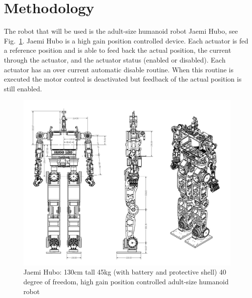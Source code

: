 \section{Methodology}

The robot that will be used is the adult-size humanoid robot Jaemi Hubo, see Fig.~\ref{fig:huboSch}.  Jaemi Hubo is a high gain position controlled device.  Each actuator is fed a reference position and is able to feed back the actual position, the current through the actuator, and the actuator status (enabled or disabled).  Each actuator has an over current automatic disable routine.  When this routine is executed the motor control is deactivated but feedback of the actual position is still enabled.

\begin{figure}[thpb]
  \centering
\includegraphics[width=1.0\columnwidth]{./pix/huboSch.png}
  \caption{Jaemi Hubo: 130cm tall 45kg (with battery and protective shell) 40 degree of freedom, high gain position controlled adult-size humanoid robot }
  \label{fig:huboSch}
\end{figure}